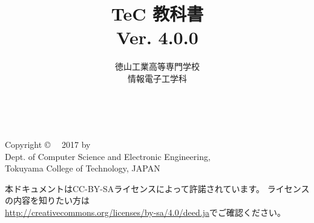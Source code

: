 \documentclass[a4paper,twocolumn,twoside,dvipdfmx]{jsbook}
\begin{document}
\frontmatter
\title{TeC 教科書\\Ver. 4.0.0}
\author{徳山工業高等専門学校\\情報電子工学科}
\date{}

\maketitle

\thispagestyle{empty}
\onecolumn
~
\vfill
\begin{flushleft}
Copyright \copyright ~~ 2017 by \\
Dept. of Computer Science and Electronic Engineering, \\
Tokuyama College of Technology, JAPAN
\end{flushleft}

\vspace{0.8cm}
本ドキュメントはCC-BY-SAライセンスによって許諾されています。
ライセンスの内容を知りたい方は\\
\url{http://creativecommons.org/licenses/by-sa/4.0/deed.ja}でご確認ください。

\setcounter{tocdepth}{2}
\tableofcontents

\twocolumn
\mainmatter

\appendix
\end{document}
